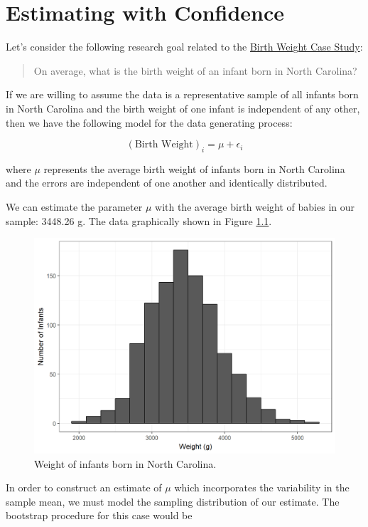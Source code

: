 \documentclass[]{book}
\theoremstyle{plain}
\theoremstyle{mydefn}
\theoremstyle{myexmpl}
\theoremstyle{remark}
\begin{document}
\chapter{Estimating with Confidence}\label{SingleConfInt}

Let's consider the following research goal related to the
\protect\hyperlink{CaseBabies}{Birth Weight Case Study}:

\begin{quote}
On average, what is the birth weight of an infant born in North
Carolina?
\end{quote}

If we are willing to assume the data is a representative sample of all
infants born in North Carolina and the birth weight of one infant is
independent of any other, then we have the following model for the data
generating process:

\[(\text{Birth Weight})_i = \mu + \epsilon_i\]

where \(\mu\) represents the average birth weight of infants born in
North Carolina and the errors are independent of one another and
identically distributed.

We can estimate the parameter \(\mu\) with the average birth weight of
babies in our sample: 3448.26 g. The data graphically shown in Figure
\ref{fig:singleconfint-histogram}.

\begin{figure}

{\centering \includegraphics[width=0.8\linewidth]{./Images/singleconfint-histogram-1} 

}

\caption{Weight of infants born in North Carolina.}\label{fig:singleconfint-histogram}
\end{figure}

In order to construct an estimate of \(\mu\) which incorporates the
variability in the sample mean, we must model the sampling distribution
of our estimate. The bootstrap procedure for this case would be
\end{document}
